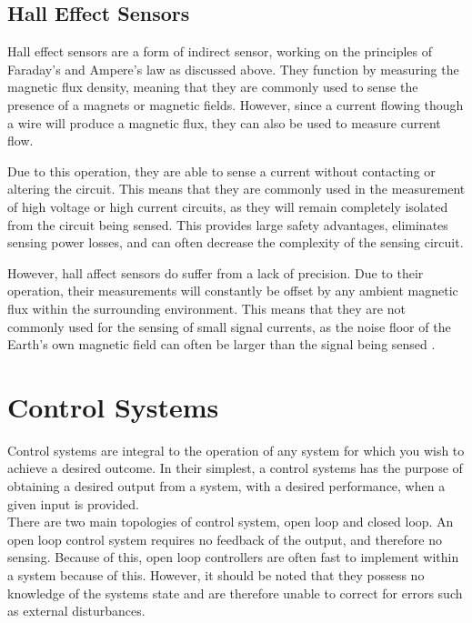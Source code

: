 \subsection{Hall Effect Sensors}\label{S:hall_effect_back}

Hall effect sensors are a form of indirect sensor, working on the principles of Faraday’s and Ampere’s law as discussed above. They function by measuring the magnetic flux density, meaning that they are commonly used to sense the presence of a magnets or magnetic fields. However, since a current flowing though a wire will produce a magnetic flux, they can also be used to measure current flow.

Due to this operation, they are able to sense a current without contacting or altering the circuit. This means that they are commonly used in the measurement of high voltage or high current circuits, as they will remain completely isolated from the circuit being sensed. This provides large safety advantages, eliminates sensing power losses, and can often decrease the complexity of the sensing circuit. 

However, hall affect sensors do suffer from a lack of precision. Due to their operation, their measurements will constantly be offset by any ambient magnetic flux within the surrounding environment. This means that they are not commonly used for the sensing of small signal currents, as the noise floor of the Earth's own magnetic field can often be larger than the signal being sensed \cite{hall_effect_precision}. 

\newpage

\section{Control Systems}\label{S:control_back}

Control systems are integral to the operation of any system for which you wish to achieve a desired outcome. In their simplest, a control systems has the purpose of obtaining a desired output from a system, with a desired performance, when a given input is provided. \\

There are two main topologies of control system, open loop and closed loop. An open loop control system requires no feedback of the output, and therefore no sensing. Because of this, open loop controllers are often fast to implement within a system because of this. However, it should be noted that they possess no knowledge of the systems state and are therefore unable to correct for errors such as external disturbances. 

